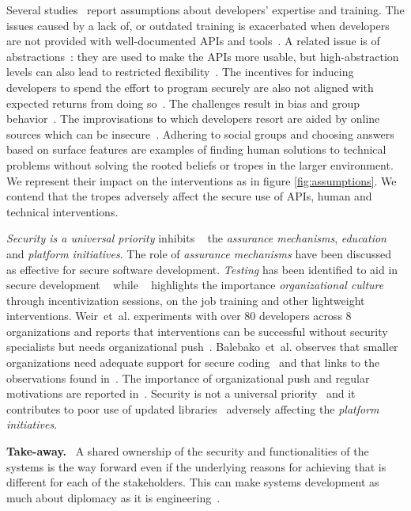 \documentclass[conference]{IEEEtran}
\newenvironment{finding}{\begin{framed}\noindent\textbf{Take-away.}~}{\end{framed}}
\newcommand{\etal}[0]{et~al{.}}
\begin{document}
Several studies~\cite{zhu2014,tyler2015,whitney2015,lipford2016} report assumptions about developers' expertise and training. The issues caused by a lack of, or outdated training is exacerbated when developers are not provided with well-documented APIs and tools~\cite{Oliveira2018soups,acarusability2017,smith2020why}. A related issue is of abstractions~\cite{anderson2013,ranenberg2020}: they are used to make the APIs more usable,  but high-abstraction levels can also lead to restricted flexibility~\cite{loiacono2017ido}. The incentives for inducing developers to spend the effort to program securely are also not aligned with expected returns from doing so~\cite{erikacar2017,naiakshina2018}. The challenges result in bias and group behavior~\cite{emmasurface2020,acar2016infosources}. The improvisations to which developers resort are aided by online sources which can be insecure~\cite{fahl2012,linden2020,acar2016infosources}. Adhering to social groups and choosing answers based on surface features are examples of finding human solutions to technical problems without solving the rooted beliefs or tropes in the larger environment. We represent their impact on the interventions as in figure \ref{fig:assumptions}. We contend that the tropes adversely affect the secure use of APIs, human and technical interventions.


 
\emph{Security is a universal priority} inhibits ~\cite{witschey2015,weir2020,McGraw2018} the \emph{assurance mechanisms},  \emph{education} and \emph{platform initiatives}. The role of \emph{assurance mechanisms} have been discussed as effective for secure software development. \emph{Testing} has been identified to aid in secure development ~\cite{jose2016} while ~\cite{weir2020,haney2018,thomas2018} highlights the importance \emph{organizational culture} through incentivization sessions, on the job training and other lightweight interventions. Weir~\etal{} experiments with over 80 developers across 8 organizations and reports that interventions can be successful without security specialists but needs organizational push~\cite{weir2021,tondel2008}. Balebako~\etal{} observes that smaller organizations need adequate support for secure coding~\cite{balebako2014} and that links to the observations found in~\cite{weir2021}.  The importance of organizational push and regular motivations are reported in~\cite{aside2012,weir2020,weir2021,adoption2014}.  Security is not a universal priority~\cite{acar2016,tahaei2019} and it contributes to poor use of updated libraries~\cite{vaniea2016} adversely affecting the \emph{platform initiatives}. 
\begin{finding}
\noindent  
A shared ownership of the security and functionalities of the systems is the way forward even if the underlying reasons for achieving that is different for each of the stakeholders. This can make systems development as much about diplomacy as it is engineering~\cite{bruce2013}.   
\end{finding}
\end{document}
